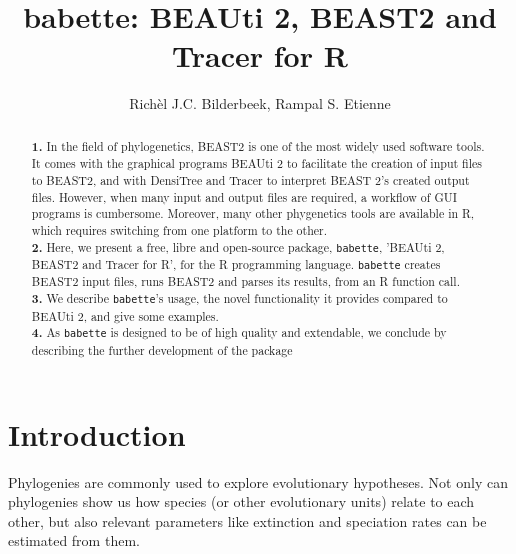 \documentclass{article}
\title{babette: BEAUti 2, BEAST2 and Tracer for R}
\author{Rich\`el J.C. Bilderbeek, Rampal S. Etienne}
\begin{document}
\maketitle


\begin{abstract}

  \textbf{1. }
    In the field of phylogenetics, 
     BEAST2 is one of the most widely used software tools. 
     It comes with the graphical programs BEAUti 2 to
     facilitate the creation of input files to BEAST2, and
     with DensiTree and Tracer 
     to interpret BEAST 2's created output files. 
     However, when many input and output files are required, 
     a workflow of GUI programs is cumbersome. 
     Moreover, many other phygenetics tools are available 
     in R, which requires switching from one platform 
     to the other. \\
  \textbf{2. }
    Here, we present a free, libre and open-source package, \verb;babette;, 
    'BEAUti 2, BEAST2 and Tracer for R', for the R programming language. 
    \verb;babette; creates BEAST2 input files, runs BEAST2 and parses its results, 
    from an R function call. \\
  \textbf{3. }
    We describe \verb;babette;'s usage, the novel functionality it provides
    compared to BEAUti 2, and give some examples. \\
  \textbf{4. }
    As \verb;babette; is designed to be of high quality and extendable, 
    we conclude by describing the further development of the package \\
\end{abstract}


\section{Introduction}

Phylogenies are commonly used to explore evolutionary hypotheses.
Not only can phylogenies show us how species (or other
evolutionary units) relate to each other, 
but also relevant parameters like extinction and 
speciation rates can be estimated from them.
\end{document}
